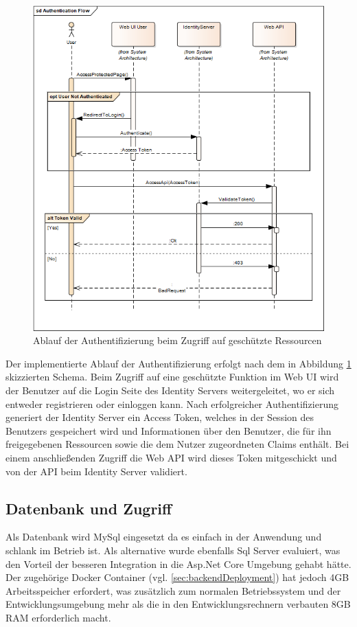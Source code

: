 \begin{figure}[htp!]
  \begin{center}
    \includegraphics[width=\textwidth]{./img/BackendAuthenticationFlow.png}
    \caption{Ablauf der Authentifizierung beim Zugriff auf geschützte Ressourcen}
    \label{fig:backendAuthenticationFlow}
  \end{center}
\end{figure}

Der implementierte Ablauf der Authentifizierung erfolgt nach dem in Abbildung \ref{fig:backendAuthenticationFlow} skizzierten Schema. Beim Zugriff auf eine geschützte Funktion im Web UI wird der Benutzer auf die Login Seite des Identity Servers weitergeleitet, wo er sich entweder registrieren oder einloggen kann. Nach erfolgreicher Authentifizierung generiert der Identity Server ein Access Token, welches in der Session des Benutzers gespeichert wird und Informationen über den Benutzer, die für ihn freigegebenen Ressourcen sowie die dem Nutzer zugeordneten Claims enthält. Bei einem anschließenden Zugriff die Web API wird dieses Token mitgeschickt und von der API beim Identity Server validiert.

\subsection{Datenbank und Zugriff}
\label{sec:dataAccess}
Als Datenbank wird MySql eingesetzt da es einfach in der Anwendung und schlank im Betrieb ist. Als alternative wurde ebenfalls Sql Server evaluiert, was den Vorteil der besseren Integration in die Asp.Net Core Umgebung gehabt hätte. Der zugehörige Docker Container (vgl. \ref{sec:backendDeployment}) hat jedoch 4GB Arbeitsspeicher erfordert, was zusätzlich zum normalen Betriebssystem und der Entwicklungsumgebung mehr als die in den Entwicklungsrechnern verbauten 8GB RAM erforderlich macht.

